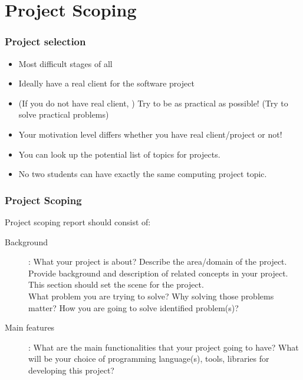 \section{Project Scoping} %
\label{sec:scoping}

\begin{frame}[t]\frametitle{Project selection}
\begin{itemize}
    \item Most difficult stages of all
    \item Ideally have a real client for the software project
    \item (If you do not have real client, ) Try to be as practical as possible! (Try to solve practical problems)
    \item Your motivation level differs whether you have real client/project or not!
    \item You can look up the potential list of topics for projects.
    \item No two students can have exactly the same computing project topic.
\end{itemize}
\end{frame}

\begin{frame}[t]\frametitle{Project Scoping}
Project scoping report should consist of:
\begin{description}
    \item[Background]: What your project is about? Describe the area/domain of the project. Provide background and description of related concepts in your project. This section should set the scene for the project. \\

    What problem you are trying to solve? Why solving those problems matter? How you are going to solve identified problem(s)?

    \item[Main features]:
    What are the main functionalities that your project going to have? What will be your choice of programming language(s), tools, libraries for developing this project?
\end{description}
\end{frame}

